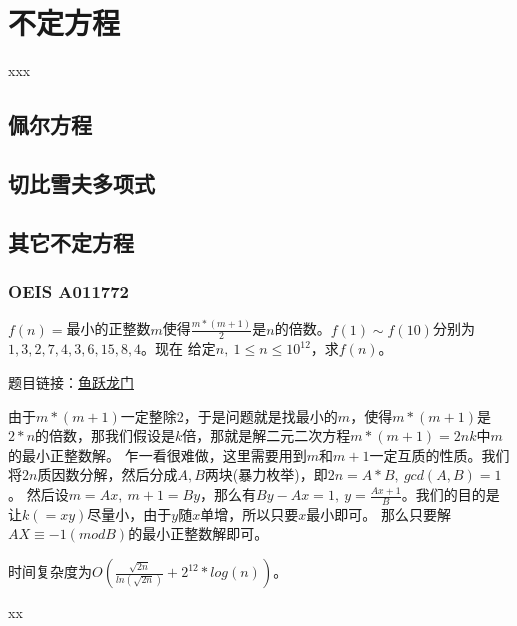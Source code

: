 \chapter{不定方程}

\begin{introduction}
	\item xxx
\end{introduction}

\section{佩尔方程}


\section{切比雪夫多项式}

\section{其它不定方程}

\subsection{OEIS A011772}
	$f(n)=$最小的正整数$m$使得$\frac{m*(m+1)}{2}$是$n$的倍数。$f(1)\sim f(10)$分别为$1, 3, 2, 7, 4, 3, 6, 15, 8, 4$。现在
	给定$n,\ 1\le n\le 10^{12}$，求$f(n)$。
	
	题目链接：\href{https://www.cometoj.com/contest/65/problem/C?problem_id=3684}{鱼跃龙门}
	
	\begin{solution}
		由于$m*(m+1)$一定整除2，于是问题就是找最小的$m$，使得$m*(m+1)$是$2*n$的倍数，那我们假设是$k$倍，那就是解二元二次方程$m*(m+1) = 2nk$中$m$的最小正整数解。
		乍一看很难做，这里需要用到$m$和$m+1$一定互质的性质。我们将$2n$质因数分解，然后分成$A,B$两块(暴力枚举)，即$2n = A*B,\ gcd(A,B)=1$。
		然后设$m=Ax,\ m+1=By$，那么有$By-Ax=1,\ y=\frac{Ax+1}{B}$。我们的目的是让$k(=xy)$尽量小，由于$y$随$x$单增，所以只要$x$最小即可。
		那么只要解$AX\equiv -1  (mod B)$的最小正整数解即可。
		
		时间复杂度为$O(\frac{\sqrt{2n}}{ln(\sqrt{2n})}+2^{12}*log(n))$。
	\end{solution}
	
	
\begin{problemset}
	\item xx
\end{problemset}